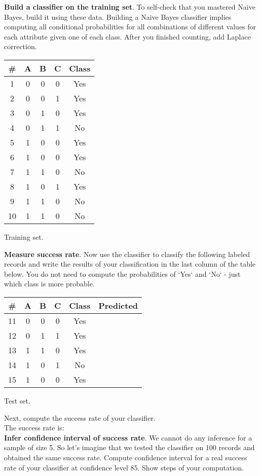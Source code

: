 \documentclass{article}
\begin{document}
{\bf Build a classifier on the training set}. 
To self-check that you mastered Naive Bayes, build it using these data. Building a Naive Bayes classifier implies computing all conditional probabilities for all combinations of different values for each attribute given one of each class. After you finished counting, add Laplace correction.

\begin{center}
\begin{tabular}{ |c|c|c|c|c| } 
 \hline
\# & A & B & C & Class \\
 \hline
1 & 0 & 0 & 0 & Yes \\
2 & 0 & 0 & 1 & Yes \\ 
3 & 0 & 1 & 0 & Yes \\ 
4 & 0 & 1 & 1 & No \\ 
5 & 1 & 0 & 0 & Yes \\ 
6 & 1 & 0 & 0 & Yes \\ 
7 & 1 & 1 & 0 & No \\ 
8 & 1 & 0 & 1 & Yes \\ 
9 & 1 & 1 & 0 & No \\ 
10 & 1 & 1 & 0 & No \\ 
 \hline
\end{tabular}
\medskip

Training set.
\end{center}

{\bf Measure success rate}. Now use the classifier to classify the following labeled records and write the results of your classification in the last column of the table below. You do not need to compute the probabilities of `Yes` and `No` - just which class is more probable. 
\begin{center}
\begin{tabular}{ |c|c|c|c|c|c| } 
 \hline
\# & A & B & C & Class & Predicted \\
 \hline
11 & 0 & 0 & 0 & Yes & \\
12 & 0 & 1 & 1 & Yes & \\
13 & 1 & 1 & 0 & Yes & \\
14 & 1 & 0 & 1 & No & \\
15 & 1 & 0 & 0 & Yes & \\
 \hline
\end{tabular}
\medskip

Test set.
\end{center}

Next, compute the success rate of your classifier. \\
The success rate is: \\

{\bf Infer confidence interval of success rate}. We cannot do any inference for a sample of size 5. So let's imagine that we tested the classifier on 100 records and obtained the same success rate.
Compute confidence interval for a real success rate of your classifier at confidence level 85. Show steps of your computation.
\end{document}
